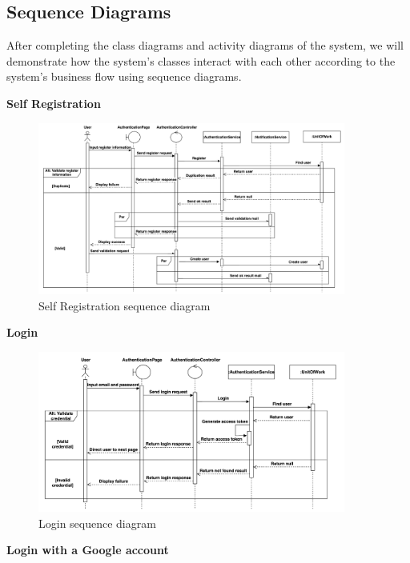 \subsection{Sequence Diagrams}

After completing the class diagrams and activity diagrams of the system, we will  demonstrate how the system's classes interact with each other according to the system's business flow using sequence diagrams.

\textbf{Self Registration}

\begin{figure}[H]
  \centering
  \includegraphics[width=0.9\textwidth]{Figures/self_register_seq.png}
  \caption{Self Registration sequence diagram}
  \label{fig:self-registration-seq}
\end{figure}


\textbf{Login}

\begin{figure}[H]
  \centering
  \includegraphics[width=0.9\textwidth]{Figures/login_seq.png}
  \caption{Login sequence diagram}
  \label{fig:login-seq}
\end{figure}
\clearpage
\textbf{Login with a Google account}

